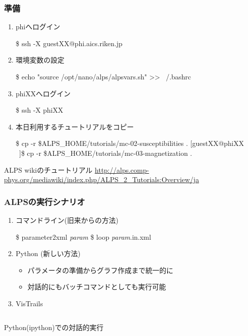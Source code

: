 \begin{frame}[fragile,shrink=10]
  \frametitle{準備}
  \begin{enumerate}
  \item<1-> phiへログイン
\begin{semiverbatim}
\$ ssh -X guestXX@phi.aics.riken.jp
\end{semiverbatim}
  \item<2-> 環境変数の設定
\begin{semiverbatim}
\$ echo "source /opt/nano/alps/alpsvars.sh" >> ~/.bashrc
\end{semiverbatim}
  \item<3-> phiXXへログイン
\begin{semiverbatim}
\$ ssh -X phiXX
\end{semiverbatim}
  \item<4-> 本日利用するチュートリアルをコピー
\begin{semiverbatim}
\$ cp -r \$ALPS\_HOME/tutorials/mc-02-susceptibilities .
[guestXX@phiXX ~]\$ cp -r \$ALPS\_HOME/tutorials/mc-03-magnetization .
\end{semiverbatim}
  \end{enumerate}
  \begin{alertblock}{ALPS wikiのチュートリアル}
    \url{http://alps.comp-phys.org/mediawiki/index.php/ALPS_2_Tutorials:Overview/ja}
  \end{alertblock}
\end{frame}

\begin{frame}[fragile]
  \frametitle{ALPSの実行シナリオ}
  \begin{enumerate}
  \item コマンドライン(旧来からの方法)
\begin{semiverbatim}
\$ parameter2xml \textit{param}
\$ loop \textit{param}.in.xml
\end{semiverbatim}
  \item \alert{Python} (新しい方法)
    \begin{itemize}
    \item パラメータの準備からグラフ作成まで統一的に
    \item 対話的にもバッチコマンドとしても実行可能
    \end{itemize}
  \item VisTrails
  \end{enumerate}
  \begin{columns}
    \begin{column}{.7\textwidth}
      \begin{center}
        \begin{alertblock}{}
          Python(ipython)での対話的実行
        \end{alertblock}
      \end{center}
    \end{column}
  \end{columns}
\end{frame}

